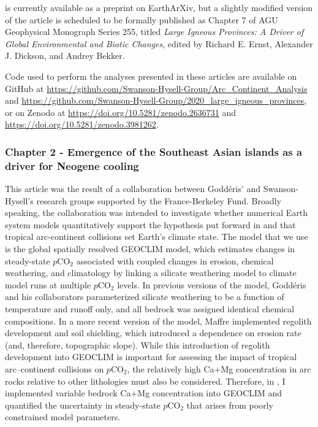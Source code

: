 \documentclass{ucbthesis}
\newcommand{\pCOtwo}{$p$CO$_{2}$\xspace}
\begin{document}
\begin{frontmatter}
\begin{preface}
\citet{Park2019a} is currently available as a preprint on EarthArXiv, but a slightly modified version of the article is scheduled to be formally published as Chapter 7 of AGU Geophysical Monograph Series 255, titled \textit{Large Igneous Provinces: A Driver of Global Environmental and Biotic Changes}, edited by Richard E. Ernst, Alexander J. Dickson, and Andrey Bekker.

Code used to perform the analyses presented in these articles are available on GitHub at \url{https://github.com/Swanson-Hysell-Group/Arc_Continent_Analysis} and \url{https://github.com/Swanson-Hysell-Group/2020_large_igneous_provinces}, or on Zenodo at \url{https://doi.org/10.5281/zenodo.2636731} and \url{https://doi.org/10.5281/zenodo.3981262}.

\subsubsection*{Chapter 2 - Emergence of the Southeast Asian islands as a driver for Neogene cooling}

\noindent
{}

\bigskip

This article was the result of a collaboration between Godd\'eris' and Swanson-Hysell's research groups supported by the France-Berkeley Fund. Broadly speaking, the collaboration was intended to investigate whether numerical Earth system models quantitatively support the hypothesis put forward in \citet{Macdonald2019a} and \citet{Swanson-Hysell2017a} that tropical arc-continent collisions set Earth's climate state. The model that we use is the global spatially resolved GEOCLIM model, which estimates changes in steady-state \pCOtwo associated with coupled changes in erosion, chemical weathering, and climatology by linking a silicate weathering model to climate model runs at multiple \pCOtwo levels. In previous versions of the model, Godd\'eris and his collaborators parameterized silicate weathering to be a function of temperature and runoff only, and all bedrock was assigned identical chemical compositions. In a more recent version of the model, Maffre implemented regolith development and soil shielding, which introduced a dependence on erosion rate (and, therefore, topographic slope). While this introduction of regolith development into GEOCLIM is important for assessing the impact of tropical arc–continent collisions on \pCOtwo, the relatively high Ca+Mg concentration in arc rocks relative to other lithologies must also be considered. Therefore, in \citet{Park2020b}, I implemented variable bedrock Ca+Mg concentration into GEOCLIM and quantified the uncertainty in steady-state \pCOtwo that arises from poorly constrained model parameters.


\end{preface}
\end{frontmatter}
\end{document}
